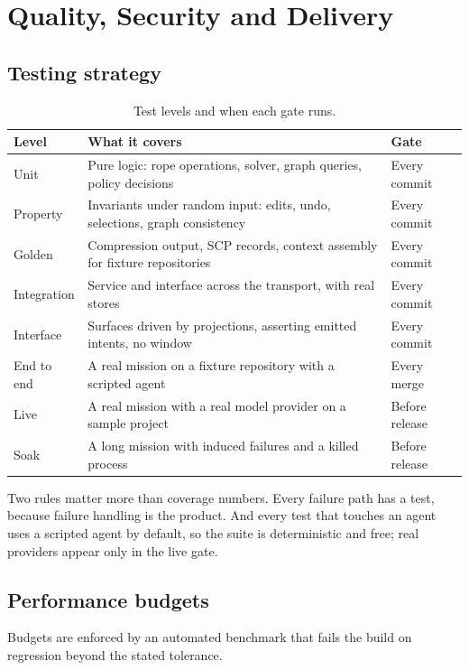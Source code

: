 \chapter{Quality, Security and Delivery}
\label{ch:quality}

\section{Testing strategy}

\begin{table}[h]
\centering
\small
\begin{tabularx}{\textwidth}{l X l}
\toprule
\textbf{Level} & \textbf{What it covers} & \textbf{Gate} \\
\midrule
Unit & Pure logic: rope operations, solver, graph queries, policy decisions & Every commit \\
Property & Invariants under random input: edits, undo, selections, graph consistency & Every commit \\
Golden & Compression output, SCP records, context assembly for fixture repositories & Every commit \\
Integration & Service and interface across the transport, with real stores & Every commit \\
Interface & Surfaces driven by projections, asserting emitted intents, no window & Every commit \\
End to end & A real mission on a fixture repository with a scripted agent & Every merge \\
Live & A real mission with a real model provider on a sample project & Before release \\
Soak & A long mission with induced failures and a killed process & Before release \\
\bottomrule
\end{tabularx}
\caption{Test levels and when each gate runs.}
\end{table}

Two rules matter more than coverage numbers. Every failure path has a test, because failure
handling is the product. And every test that touches an agent uses a scripted agent by
default, so the suite is deterministic and free; real providers appear only in the live gate.

\section{Performance budgets}

Budgets are enforced by an automated benchmark that fails the build on regression beyond the
stated tolerance.

